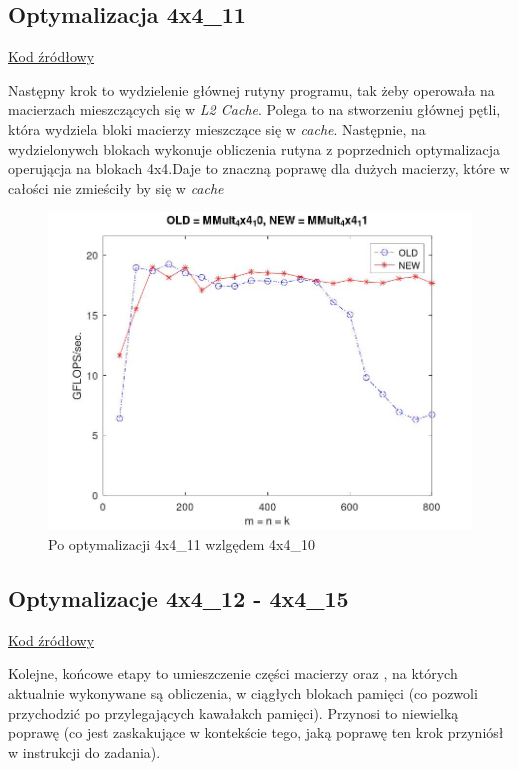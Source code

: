 \documentclass{article}
\begin{document}
\subsection{Optymalizacja 4x4\_11}

\href{https://github.com/flame/how-to-optimize-gemm/blob/master/src/MMult_4x4_11.c}{Kod źródłowy}

Następny krok to wydzielenie głównej rutyny programu, tak żeby operowała na macierzach mieszczących się w \textit{L2 Cache}. Polega to na stworzeniu głównej pętli, która wydziela bloki macierzy 
mieszczące się w \textit{cache}. Następnie, na wydzielonywch blokach wykonuje obliczenia rutyna z poprzednich
optymalizacja operującja na blokach 4x4.Daje to znaczną poprawę dla dużych macierzy, które w całości nie zmieściły by się w \textit{cache}

\begin{figure}[H]
    \centering
    \includegraphics[width=1.0\textwidth]{figure8.jpg}
    \caption{Po optymalizacji 4x4\_11 wzlgędem 4x4\_10}
\end{figure}

\subsection{Optymalizacje 4x4\_12 - 4x4\_15}

\href{https://github.com/flame/how-to-optimize-gemm/blob/master/src/MMult_4x4_15.c}{Kod źródłowy}

Kolejne, końcowe etapy to umieszczenie części macierzy  oraz , na których
aktualnie wykonywane są obliczenia, w ciągłych blokach pamięci (co pozwoli przychodzić po 
przylegających kawałakch pamięci). Przynosi to niewielką poprawę
(co jest zaskakujące w kontekście tego, jaką poprawę ten krok przyniósł w instrukcji do zadania).
\end{document}
